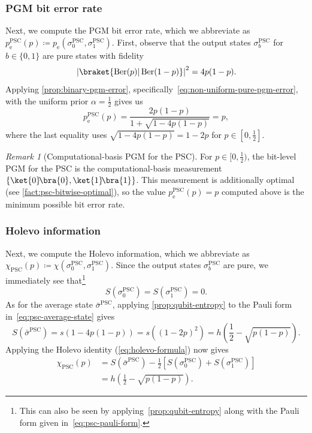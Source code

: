 \documentclass[11pt]{article}
\theoremstyle{remark}
\newtheorem{remark}{Remark}[section]
\newcommand{\ketbra}[2]{\ket{#1}\!\bra{#2}}
\newcommand{\Ber}{\operatorname{Ber}}
\newcommand{\bits}{\{0,1\}}
\newcommand{\abs}[1]{\left|#1\right|}
\newcommand{\PSC}{\mathrm{PSC}}
\begin{document}
\subsubsection{PGM bit error rate}
\label{subsubsec:psc-pgm-error}

Next, we compute the PGM bit error rate, which we abbreviate as $p_{\mathrm{e}}^{\PSC}(p) \coloneqq p_{\mathrm{e}}(\sigma_0^{\PSC},\sigma_1^{\PSC})$. First, observe that the output states $\sigma_b^{\PSC}$ for $b \in \bits$ are pure states with fidelity
\begin{equation*}
\abs{\braket{\Ber(p)|\Ber(1-p)}}^2 = 4p(1-p).
\end{equation*}
Applying \cref{prop:binary-pgm-error}, specifically~\eqref{eq:non-uniform-pure-pgm-error}, with the uniform prior $\alpha=\frac{1}{2}$ gives us
\begin{equation}
p_{\mathrm{e}}^{\PSC}(p) = \frac{2p(1-p)}{1+\sqrt{1-4p(1-p)}} = p,
\end{equation}
where the last equality uses $\sqrt{1-4p(1-p)} = 1-2p$ for $p \in [0,\frac{1}{2}]$.

\begin{remark}[Computational-basis PGM for the PSC]
\label{rem:psc-pgm-optimal}
For $p \in [0,\frac{1}{2})$, the bit-level PGM for the PSC is the computational-basis measurement $\{\ketbra{0}{0}, \ketbra{1}{1}\}$. This measurement is additionally optimal (see \cref{fact:psc-bitwise-optimal}), so the value $p_{\mathrm{e}}^{\PSC}(p) = p$ computed above is the minimum possible bit error rate.
\end{remark}

\subsubsection{Holevo information}
\label{subsubsec:psc-holevo}

Next, we compute the Holevo information, which we abbreviate as $\chi_{\PSC}(p) \coloneqq \chi(\sigma_0^{\PSC},\sigma_1^{\PSC})$. Since the output states $\sigma_b^{\PSC}$ are pure, we immediately see that\footnote{This can also be seen by applying~\cref{prop:qubit-entropy} along with the Pauli form given in~\cref{eq:psc-pauli-form}.}
\begin{equation*}
S(\sigma_0^{\PSC}) = S(\sigma_1^{\PSC}) = 0.
\end{equation*}
As for the average state $\bar{\sigma}^{\PSC}$, applying \cref{prop:qubit-entropy} to the Pauli form in~\eqref{eq:psc-average-state} gives
\begin{equation*}
S(\bar{\sigma}^{\PSC})
= s\left(1-4p(1-p)\right)
= s\left((1-2p)^2\right)
= h\left(\frac{1}{2}-\sqrt{p(1-p)}\right).
\end{equation*}
Applying the Holevo identity (\cref{eq:holevo-formula}) now gives
\begin{align*}
\chi_{\PSC}(p)
&= S(\bar{\sigma}^{\PSC})-\frac{1}{2}\left[S(\sigma_0^{\PSC})+S(\sigma_1^{\PSC})\right] \\
&= h\left(\frac{1}{2}-\sqrt{p(1-p)}\right).
\end{align*}
\end{document}
